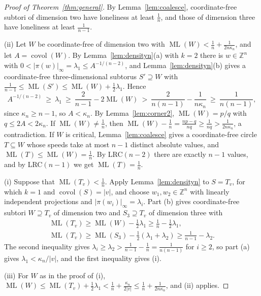 \documentclass[12pt]{amsart}
\theoremstyle{definition}\newtheorem{definition}[theorem]{Definition}
\theoremstyle{remark}\newtheorem{remark}[theorem]{Remark}
\newcommand{\Z}{\mathbb Z}\newcommand{\R}{\mathbb R}\newcommand{\T}{\mathbb T}
\newcommand{\ML}{\operatorname{ML}}
\newcommand{\covol}{\operatorname{covol}}
\newcommand{\supn}[1]{\lvert #1\rvert_\infty}
\newcommand{\eucl}[1]{\lvert #1\rvert}
\begin{document}
\begin{proof}[Proof of Theorem~\ref{thm:general}]
By Lemma~\ref{lem:coalesce}, coordinate-free subtori of dimension two have loneliness at least $\frac1n$, and those of dimension three have loneliness at least $\frac1{n-1}$.

(ii) Let $W$ be coordinate-free of dimension two with $\ML(W)<\frac1n+\frac1{2n\kappa_n}$, and let $A=\covol(W)$. By Lemma~\ref{lem:densityn}(a) with $k=2$ there is $w\in\Z^n$ with $0<\supn{\pi(w)}=\lambda_1\le A^{-1/(n-2)}$, and Lemma~\ref{lem:densityn}(b) gives a coordinate-free three-dimensional subtorus $S'\supseteq W$ with $\frac1{n-1}\le\ML(S')\le\ML(W)+\frac12\lambda_1$. Hence
\[
 A^{-1/(n-2)}\ \ge\ \lambda_1\ \ge\ \frac2{n-1}-2\ML(W)\ >\ \frac2{n(n-1)}-\frac1{n\kappa_n}\ \ge\ \frac1{n(n-1)},
\]
since $\kappa_n\ge n-1$, so $A<\kappa_n$. By Lemma~\ref{lem:corner2}, $\ML(W)=p/q$ with $q\le2A<2\kappa_n$. If $\ML(W)\ne\frac1n$, then $\ML(W)-\frac1n=\frac{np-q}{nq}\ge\frac1{nq}>\frac1{2n\kappa_n}$, a contradiction. If $W$ is critical, Lemma~\ref{lem:coalesce} gives a coordinate-free circle $T\subseteq W$ whose speeds take at most $n-1$ distinct absolute values, and $\ML(T)\le\ML(W)=\frac1n$. By LRC$(n-2)$ there are exactly $n-1$ values, and by LRC$(n-1)$ we get $\ML(T)=\frac1n$.

(i) Suppose that $\ML(T_v)<\frac1n$. Apply Lemma~\ref{lem:densityn} to $S=T_v$, for which $k=1$ and $\covol(S)=\eucl v$, and choose $w_1,w_2\in\Z^n$ with linearly independent projections and $\supn{\pi(w_i)}=\lambda_i$. Part (b) gives coordinate-free subtori $W\supseteq T_v$ of dimension two and $S_3\supseteq T_v$ of dimension three with
\begin{gather*}
 \ML(T_v)\ge\ML(W)-\tfrac12\lambda_1\ge\tfrac1n-\tfrac12\lambda_1,\\ \ML(T_v)\ge\ML(S_3)-\tfrac12(\lambda_1+\lambda_2)\ge\tfrac1{n-1}-\lambda_2.
\end{gather*}
The second inequality gives $\lambda_i\ge\lambda_2>\frac1{n-1}-\frac1n=\frac1{n(n-1)}$ for $i\ge2$, so part (a) gives $\lambda_1<\kappa_n/\eucl v$, and the first inequality gives (i).

(iii) For $W$ as in the proof of (i), $\ML(W)\le\ML(T_v)+\frac12\lambda_1<\frac1n+\frac{\kappa_n}{2\eucl v}\le\frac1n+\frac1{2n\kappa_n}$, and (ii) applies.
\end{proof}
\end{document}
